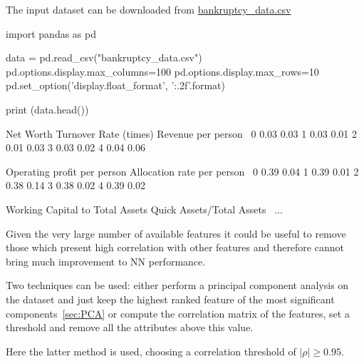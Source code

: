 The input dataset can be downloaded from \href{https://raw.githubusercontent.com/matteosan1/finance_course/develop/libro/input_files/bankruptcy_data.csv}{bankruptcy\_data.csv}
\begin{ipython}
import pandas as pd
	
data = pd.read_csv("bankruptcy_data.csv")
pd.options.display.max_columns=100
pd.options.display.max_rows=10
pd.set_option('display.float_format', '{:.2f}'.format)
	
print (data.head())
\end{ipython}
\begin{ioutput}
Net Worth Turnover Rate (times)  Revenue per person  \
0                          0.03                0.03   
1                          0.03                0.01   
2                          0.01                0.03   
3                          0.03                0.02   
4                          0.04                0.06   
	
Operating profit per person  Allocation rate per person  \
0                      0.39                        0.04   
1                      0.39                        0.01   
2                      0.38                        0.14   
3                      0.38                        0.02   
4                      0.39                        0.02   

Working Capital to Total Assets  Quick Assets/Total Assets  \
...                        
\end{ioutput}

Given the very large number of available features it could be useful to remove those which present high correlation with other features and therefore cannot bring much improvement to NN performance.

Two techniques can be used: either perform a principal component analysis on the dataset and just keep the highest ranked feature of the most significant components~\ref{sec:PCA} or compute the correlation matrix of the features, set a threshold and remove all the attributes above this value.

Here the latter method is used, choosing a correlation threshold of $|\rho|\geq 0.95$.

